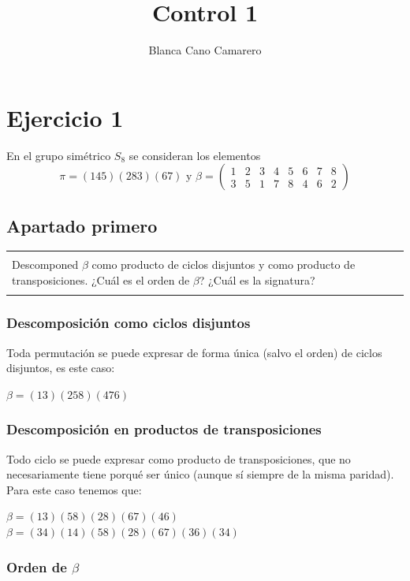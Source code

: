 \documentclass[12pt]{article}
\title{Control 1}
\author{Blanca Cano Camarero}
\newenvironment{micaja}
{
    \begin{center}
    \begin{tabular}{|p{0.9\textwidth}|}
    \hline\\
    }   
    {   
    \\\\\hline
    \end{tabular} 
    \end{center}
    }
\begin{document}
\begin{titlepage}
\maketitle
\tableofcontents
\end{titlepage}

\section{Ejercicio 1}
En el grupo simétrico $S_8$ se consideran los elementos
\begin{equation*}
    \pi = (145)(283)(67) \text{ y } 
    \beta = \begin{pmatrix}
      1 & 2 & 3 & 4 & 5 & 6 & 7 & 8 \\ 
        3 & 5 & 1 & 7 & 8 & 4 & 6 & 2      
    \end{pmatrix}
\end{equation*}
\subsection{Apartado primero}
\begin{micaja}
 Descomponed $\beta$ como producto de ciclos disjuntos y como producto de transposiciones. ¿Cuál es el orden de $\beta$? ¿Cuál es la signatura?
\end{micaja}

 \subsubsection*{Descomposición como ciclos disjuntos}
 Toda permutación se puede expresar de forma única (salvo el orden) de ciclos disjuntos, es este caso:
 
$\beta = (1 3) (2 5 8) (4 7 6)$
\subsubsection*{Descomposición en productos de transposiciones}
Todo ciclo se puede expresar como producto de transposiciones, que no necesariamente tiene porqué ser único (aunque sí siempre de la misma paridad). Para este caso tenemos que:

$\beta = (1 3) (5 8) (2 8) (6 7)(4 6)$
$\beta = (3 4)(1 4) (5 8) (2 8) (6 7) (3 6) (3 4)$

\subsubsection*{Orden de $\beta$}
\end{document}

